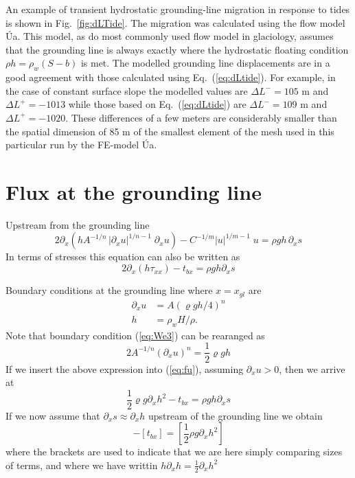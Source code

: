 \documentclass[10pt,a4paper]{book}
\newcommand{\p}{\partial}
\newcommand{\txx}{\tau_{xx}}
\begin{document}
An example of transient hydrostatic grounding-line migration in
response to tides is shown in Fig.~\ref{fig:dLTide}. The migration was
calculated using the flow model \'Ua. This model, as do most commonly
used flow model in glaciology, assumes that the grounding line is
always exactly where the hydrostatic floating condition $\rho h=\rho_w
(S-b)$ is met. The modelled grounding line displacements are in a good
agreement with those calculated using Eq.~(\ref{eq:dLtide}). For
example, in the case of constant surface slope the modelled values are
$\Delta L^{-}=105$ m and $\Delta L^{+}=-1013$ while those based on
Eq.~(\ref{eq:dLtide}) are $\Delta L^{-}=109$ m and $\Delta
L^{+}=-1020$. These differences of a few meters are considerably
smaller than the spatial dimension of 85 m of the smallest element of
the mesh used in this particular run by the FE-model \'Ua.





\section{Flux at the grounding line}
\label{sec:FGL}

Upstream from the grounding line
\begin{equation}
  2 \p_x \left (h A^{-1/n} \, | \p_x u|^{1/n-1} \; \p_x u \right ) - C^{-1/m} |u|^{1/m-1} \; u = \rho g h \, \p_x s
\label{eq:fu}
\end{equation}
In terms of stresses this equation can also be written as
\begin{equation}
  2 \p_x (h \txx) -t_{bx}= \rho g h \p_x s
\label{eq:fs}
\end{equation}


Boundary conditions at the grounding line where $x=x_{gl}$ are
\begin{align}
\p_x u &= A (\varrho g h/4)^n  \label{eq:We3} \\
     h&=\rho_w H /\rho . \label{eq:fc}
\end{align}
Note that boundary condition (\ref{eq:We3}) can be rearanged as
\[
2 A^{-1/n} (\p_x u)^n = \frac{1}{2} \varrho g h
\]
If we insert the above expression into (\ref{eq:fu}), assuming $\p_x u > 0$, then we arrive at
\[
\frac{1}{2}\varrho g \p_x h^2  - t_{bx} = \rho g h \p_x s
\]
If we now assume that $\p_x s \approx \p_x h$ upstream of the grounding line we obtain
\begin{equation}
[\frac{1}{2} \varrho g \p_x h^2] - [t_{bx}] = [\frac{1}{2} \rho g \p_x h^2]
\label{eq:ghp}
\end{equation}
where the brackets are used to indicate that we are here simply
comparing sizes of terms, and where we have writtin $ h \p_x h = \frac{1}{2} \p_x h^2 $
\end{document}
